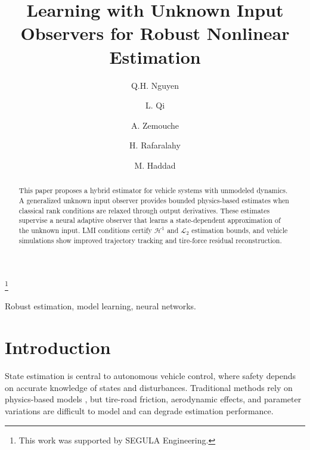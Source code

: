 \documentclass{ifacconf}
\begin{document}
\begin{frontmatter}

\title{Learning with Unknown Input Observers for Robust Nonlinear Estimation}  

\thanks[footnoteinfo]{This work was supported by SEGULA Engineering.}

\author[First]{Q.H. Nguyen} 
\author[First]{L. Qi}
\author[First]{A. Zemouche}
\author[First]{H. Rafaralahy}
\author[Second]{M. Haddad}

\address[First]{Universit\'e de Lorraine, CNRS, CRAN, F-57000 Metz (e-mail: quang-huy.nguyen@univ-lorraine.fr).}
\address[Second]{SEGULA Engineering, 19 rue d'Arras, 92000 Nanterre, France (e-mail: madjid.haddad@segula.fr)}

\begin{abstract}                %
This paper proposes a hybrid estimator for vehicle systems with unmodeled dynamics. A generalized unknown input observer provides bounded physics-based estimates when classical rank conditions are relaxed through output derivatives. These estimates supervise a neural adaptive observer that learns a state-dependent approximation of the unknown input. LMI conditions certify $\mathcal{H}^{1}$ and $\mathcal{L}_{2}$ estimation bounds, and vehicle simulations show improved trajectory tracking and tire-force residual reconstruction.
\end{abstract}

\begin{keyword}
Robust estimation, model learning, neural networks.
\end{keyword}

\end{frontmatter}




\section{Introduction}\label{sec_introduction}

State estimation is central to autonomous vehicle control, where safety depends on accurate knowledge of states and disturbances. Traditional methods rely on physics-based models \citep{State_Esti2017}, but tire-road friction, aerodynamic effects, and parameter variations are difficult to model and can degrade estimation performance.
\end{document}
